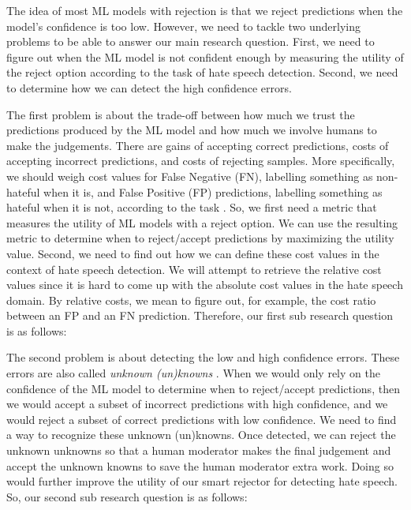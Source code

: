 
The idea of most ML models with rejection is that we reject predictions when the model's confidence is too low. However, we need to tackle two underlying problems to be able to answer our main research question. First, we need to figure out when the ML model is not confident enough by measuring the utility of the reject option according to the task of hate speech detection. Second, we need to determine how we can detect the high confidence errors.

The first problem is about the trade-off between how much we trust the predictions produced by the ML model and how much we involve humans to make the judgements. There are gains of accepting correct predictions, costs of accepting incorrect predictions, and costs of rejecting samples. More specifically, we should weigh cost values for False Negative (FN), labelling something as non-hateful when it is, and False Positive (FP) predictions, labelling something as hateful when it is not, according to the task \cite{sayin2021science}. So, we first need a metric that measures the utility of ML models with a reject option. We can use the resulting metric to determine when to reject/accept predictions by maximizing the utility value. Second, we need to find out how we can define these cost values in the context of hate speech detection. We will attempt to retrieve the relative cost values since it is hard to come up with the absolute cost values in the hate speech domain. By relative costs, we mean to figure out, for example, the cost ratio between an FP and an FN prediction. Therefore, our first sub research question is as follows:


The second problem is about detecting the low and high confidence errors. These errors are also called \textit{unknown (un)knowns} \cite{liu2020towards}. When we would only rely on the confidence of the ML model to determine when to reject/accept predictions, then we would accept a subset of incorrect predictions with high confidence, and we would reject a subset of correct predictions with low confidence. We need to find a way to recognize these unknown (un)knowns. Once detected, we can reject the unknown unknowns so that a human moderator makes the final judgement and accept the unknown knowns to save the human moderator extra work. Doing so would further improve the utility of our smart rejector for detecting hate speech. So, our second sub research question is as follows:

